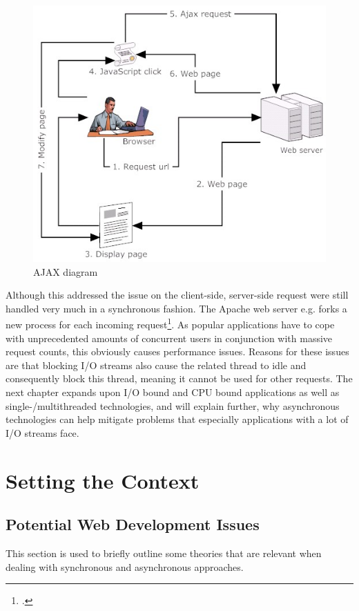 \begin{figure}[hbtp]
\centering
\includegraphics[scale=0.5]{img/ajax-diagram}
\caption[AJAX diagram]{AJAX diagram\label{img_ajax}}
\end{figure}

Although this addressed the issue on the client-side, server-side request were
still handled very much in a synchronous fashion. The Apache web server e.g.
forks a new process for each incoming request\footcite[Cf.][]{apache_2013}.
As popular applications have to cope with unprecedented amounts of concurrent
users in conjunction with massive request counts, this obviously causes
performance issues. Reasons for these issues are that blocking I/O streams also
cause the related thread to idle and consequently block this thread, meaning it
cannot be used for other requests. The next chapter expands upon I/O bound and
CPU bound applications as well as single-/multithreaded technologies, and will
explain further, why asynchronous technologies can help mitigate problems that
especially applications with a lot of I/O streams face.\\

\newpage
\section{Setting the Context}
\label{setting_the_context}

\subsection{Potential Web Development Issues}
\label{potentialissues}
This section is used to briefly outline some theories that are relevant when dealing with synchronous and asynchronous approaches.

